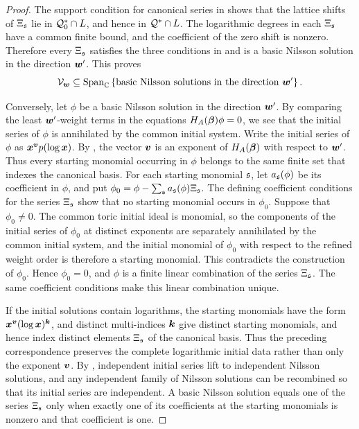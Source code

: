 \begin{proof}
	The support condition for canonical series in \cite[Section~2.5]{SST00} shows that the lattice shifts of \(\Xi_{\mathfrak s}\) lie in \(\mathcal Q_0^*\cap L\), and hence in \(\mathcal Q^*\cap L\).
	The logarithmic degrees in each \(\Xi_{\mathfrak s}\) have a common finite bound, and the coefficient of the zero shift is nonzero.
	Therefore every \(\Xi_{\mathfrak s}\) satisfies the three conditions in \cite[Definition~2.6]{DMM12} and is a basic Nilsson solution in the direction \(\boldsymbol{w}'\).
	This proves
	\[
		\mathcal V_{\boldsymbol{w}}
		\subseteq
		\operatorname{Span}_{\mathbb C}
		\left\{
		\text{basic Nilsson solutions in the direction \(\boldsymbol{w}'\)}
		\right\}.
	\]

	Conversely, let \(\phi\) be a basic Nilsson solution in the direction \(\boldsymbol{w}'\).
	By comparing the least \(\boldsymbol{w}'\)-weight terms in the equations \(H_A(\boldsymbol{\beta})\phi=0\), we see that the initial series of \(\phi\) is annihilated by the common initial system.
	Write the initial series of \(\phi\) as \(\boldsymbol{x}^{\boldsymbol{v}}p(\log\boldsymbol{x})\).
	By \cite[Lemma~2.10]{DMM12}, the vector \(\boldsymbol{v}\) is an exponent of \(H_A(\boldsymbol{\beta})\) with respect to \(\boldsymbol{w}'\).
	Thus every starting monomial occurring in \(\phi\) belongs to the same finite set that indexes the canonical basis.
	For each starting monomial \(\mathfrak s\), let \(a_{\mathfrak s}(\phi)\) be its coefficient in \(\phi\), and put \(\phi_0 = \phi - \sum_{\mathfrak s} a_{\mathfrak s}(\phi)\Xi_{\mathfrak s}\).
	The defining coefficient conditions for the series \(\Xi_{\mathfrak s}\) show that no starting monomial occurs in \(\phi_0\).
	Suppose that \(\phi_0\ne0\).
	The common toric initial ideal is monomial, so the components of the initial series of \(\phi_0\) at distinct exponents are separately annihilated by the common initial system, and the initial monomial of \(\phi_0\) with respect to the refined weight order is therefore a starting monomial.
	This contradicts the construction of \(\phi_0\).
	Hence \(\phi_0=0\), and \(\phi\) is a finite linear combination of the series \(\Xi_{\mathfrak s}\).
	The same coefficient conditions make this linear combination unique.

	If the initial solutions contain logarithms, the starting monomials have the form \(\boldsymbol{x}^{\boldsymbol{v}}(\log\boldsymbol{x})^{\boldsymbol{k}}\), and distinct multi-indices \(\boldsymbol{k}\) give distinct starting monomials, and hence index distinct elements \(\Xi_{\mathfrak s}\) of the canonical basis.
	Thus the preceding correspondence preserves the complete logarithmic initial data rather than only the exponent \(\boldsymbol{v}\).
	By \cite[Lemma~2.8]{DMM12}, independent initial series lift to independent Nilsson solutions, and any independent family of Nilsson solutions can be recombined so that its initial series are independent.
	A basic Nilsson solution equals one of the series \(\Xi_{\mathfrak s}\) only when exactly one of its coefficients at the starting monomials is nonzero and that coefficient is one.
\end{proof}


